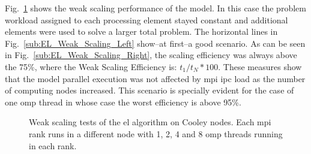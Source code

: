 \documentclass[10pt,journal,compsoc]{IEEEtran}
\begin{document}
Fig.~\ref{fig:EL_Weak_Scaling} shows the weak scaling performance of the model. In this case the problem workload assigned to each processing element stayed constant and additional elements were used to solve a larger total problem. The horizontal lines in Fig.~\ref{sub:EL_Weak_Scaling_Left} show--at first--a good scenario. As can be seen in Fig.~\ref{sub:EL_Weak_Scaling_Right}, the scaling efficiency was always above the 75\%, where the Weak Scaling Efficiency is: $t_1 / t_N * 100$. These measures show that the model parallel execution was not affected by \gls{mpi} \gls{ipc} load as the number of computing nodes increased. This scenario is specially evident for the case of one \gls{omp} thread in whose case the worst efficiency is above 95\%.

\begin{figure}[tb] 
    \centering
    \hfill

	\caption{Weak scaling tests of the \gls{el} algorithm on Cooley nodes. Each \gls{mpi} rank runs in a different node with 1, 2, 4 and 8 \gls{omp} threads running in each rank.}
  \label{fig:EL_Weak_Scaling} 
\end{figure}


\end{document}
